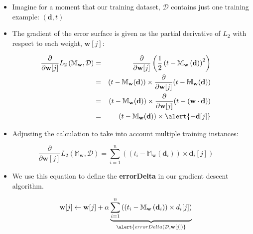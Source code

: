 \documentclass[xcolor={table}]{beamer}
\begin{document}
\begin{frame}
\begin{itemize} 
 \item Imagine for a moment that our training dataset, $\mathcal{D}$ contains \alert{just one training} example: $(\mathbf{d}, t)$
 \item The gradient of the error surface is given as the partial derivative of $L_2$ with respect to each weight, $\mathbf{w}[j]$:

 \end{itemize}
  
\begin{eqnarray}
\frac{\partial}{\partial \mathbf{w}[j]} L_2 \left( \mathbb{M}_{\mathbf{w}}, \mathcal{D} \right) & =  & \frac{\partial}{\partial \mathbf{w}[j]} \left( \frac{1}{2} \left(t - \mathbb{M}_{\mathbf{w}} \left( \mathbf{d} \right) \right) ^2 \right) \label{eqn:gradDesc1} \\
						& = & (t - \mathbb{M}_{\mathbf{w}}(\mathbf{d})) \times \frac{\partial}{\partial \mathbf{w}[j]} (t - \mathbb{M}_{\mathbf{w}}(\mathbf{d})) \label{eqn:gradDesc2} \\
						& = & (t - \mathbb{M}_{\mathbf{w}}(\mathbf{d})) \times \frac{\partial}{\partial \mathbf{w}[j]} (t - (\mathbf{w} \cdot \mathbf{d})) \label{eqn:gradDesc3} \\
						& = & (t - \mathbb{M}_{\mathbf{w}}(\mathbf{d})) \times \alert{-\mathbf{d}[j]} \label{eqn:gradDesc4} 
\end{eqnarray}

\end{frame} 

 \begin{frame} 
 \begin{itemize}
	\item Adjusting the calculation to take into account multiple training instances:
\end{itemize}
\begin{equation*}
	\frac{\partial}{\partial \mathbf{w}[j]} L_2(\mathbb{M}_{\mathbf{w}}, \mathcal{D})  =   \sum_{i=1}^{n} \left(\left(t_i - \mathbb{M}_{\mathbf{w}}\left(\mathbf{d}_i\right)\right)\times \mathbf{d}_i[j]\right)
\end{equation*}
\begin{itemize}
	\item We use this equation to define the \textbf{errorDelta} in our gradient descent algorithm.
\end{itemize}
\begin{equation*}
	\mathbf{w}[j] \leftarrow \mathbf{w}[j] + \alpha \underbrace{\sum_{i=1}^{n} \left(\left(t_i - \mathbb{M}_{\mathbf{w}}\left(\mathbf{d}_i\right)\right)\times d_i[j]\right)}_{\alert{errorDelta(\mathcal{D}, \mathbf{w}[j])}}
\end{equation*}
\end{frame} 
\end{document}
